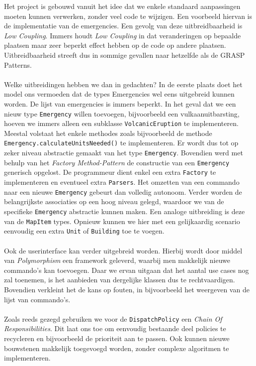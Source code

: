 \label{uitbreidbaarheid}
Het project is gebouwd vanuit het idee dat we enkele standaard aanpassingen moeten kunnen verwerken, zonder veel code te wijzigen. Een voorbeeld hiervan is de implementatie van de emergencies. Een gevolg van deze uitbreidbaarheid is \textit{Low Coupling}. Immers houdt \textit{Low Coupling} in dat veranderingen op bepaalde plaatsen maar zeer beperkt effect hebben op de code op andere plaatsen. Uitbreidbaarheid streeft dus in sommige gevallen naar hetzelfde als de GRASP Patterns.
\paragraph{}
Welke uitbreidingen hebben we dan in gedachten? In de eerste plaats doet het model ons vermoeden dat de types Emergencies wel eens uitgebreid kunnen worden. De lijst van emergencies is immers beperkt. In het geval dat we een nieuw type \texttt{Emergency} willen toevoegen, bijvoorbeeld een vulkaanuitbarsting, hoeven we immers alleen een subklasse \texttt{VolcanicEruption} te implementeren. Meestal volstaat het enkele methodes zoals bijvoorbeeld de methode \texttt{Emergency.calculateUnitsNeeded()} te implementeren. Er wordt dus tot op zeker niveau abstractie gemaakt van het type \texttt{Emergency}. Bovendien werd met behulp van het \textit{Factory Method-Pattern} de constructie van een \texttt{Emergency} generisch opgelost. De programmeur dient enkel een extra \texttt{Factory} te implementeren en eventueel extra \texttt{Parsers}. Het omzetten van een commando naar een nieuwe \texttt{Emergency} gebeurt dan volledig autonoom. Verder worden de belangrijkste associaties op een hoog niveau gelegd, waardoor we van de specifieke \texttt{Emergency} abstractie kunnen maken. Een analoge uitbreiding is deze van de \texttt{MapItem} types. Opnieuw kunnen we hier met een gelijkaardig scenario eenvoudig een extra \texttt{Unit} of \texttt{Building} toe te voegen.
\paragraph{}
Ook de userinterface kan verder uitgebreid worden. Hierbij wordt door middel van \textit{Polymorphism} een framework geleverd, waarbij men makkelijk nieuwe commando's kan toevoegen. Daar we ervan uitgaan dat het aantal use cases nog zal toenemen, is het aanbieden van dergelijke klassen dus te rechtvaardigen. Bovendien verkleint het de kans op fouten, in bijvoorbeeld het weergeven van de lijst van commando's.
\paragraph{}
Zoals reeds gezegd gebruiken we voor de \texttt{DispatchPolicy} een \textit{Chain Of Responsibilities}. Dit laat ons toe om eenvoudig bestaande deel policies te recycleren en bijvoorbeeld de prioriteit aan te passen. Ook kunnen nieuwe bouwstenen makkelijk toegevoegd worden, zonder complexe algoritmen te implementeren.
